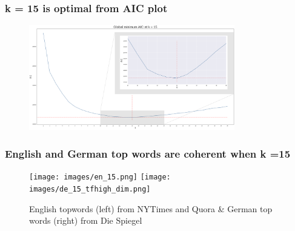 \documentclass{tum-presentation}
\begin{document}
\begin{frame}
  \frametitle{k = 15 is optimal from AIC plot}
  \begin{figure}[t]
      \includegraphics[width=0.8\textwidth]{images/AICs_combined.png}
  \end{figure}
\end{frame}

\begin{frame}
  \frametitle{English and German top words are coherent when k =15}
  \begin{figure}[t]
      \texttt{[image: images/en\_15.png]}
      \vspace{1em}
      \texttt{[image: images/de\_15\_tfhigh\_dim.png]}
      \caption{English topwords (left) from NYTimes and Quora & German top words (right) from Die Spiegel}
  \end{figure}
\end{frame}
\end{document}
